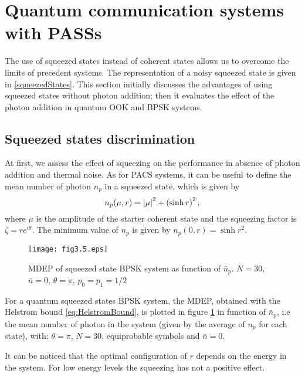 \section{Quantum communication systems with PASSs}
    The use of squeezed states instead of coherent states allows us to overcome the limits
    of precedent systems. The representation of a noisy squeezed state is given in 
    \ref{squeezedStates}. This section initially discusses the advantages of using squeezed states 
    without photon addition; then it evaluates the effect of the photon addition
    in quantum OOK and BPSK systems.

    \subsection{Squeezed states discrimination}
        At first, we assess the effect of squeezing on the performance in absence of photon 
        addition and thermal noise. As for PACS systems, it can be useful to define the mean 
        number of photon $n_p$ in a squeezed state, which is given by
        \begin{equation}
            n_p(\mu,r) = \absolutevalue{\mu}^2 + \left(\sinh{r}\right)^2;
        \end{equation}
        where $\mu$ is the amplitude of the starter coherent state and the squeezing factor
        is $\zeta = r e^{i\theta}$. The minimum value of $n_p$ is given by $n_p(0,r) = \sinh{r}^2$.

        \begin{figure}[tbp]
            \begin{center}
                \texttt{[image: fig3.5.eps]}
                \caption{MDEP of squeezed state BPSK system as function of $\bar{n}_p$. 
                    $N=30$, $\bar{n}=0$, $\theta=\pi$, $p_0=p_1=1/2$}
                \label{fig:3.5}
            \end{center}     
        \end{figure}
        For a quantum squeezed states BPSK system, the MDEP, obtained with the Helstrom bound 
        \ref{eq:HelstromBound}, is plotted in figure \ref{fig:3.5} in function of $\bar{n}_p$,
        i.e the mean number of photon in the system (given by the average of $n_p$ for each state), with:
        $\theta=\pi$, $N=30$, equiprobable symbols and $\bar{n}=0$.

        It can be noticed that the optimal configuration of $r$ depends on the energy in the 
        system. For low energy levels the squeezing has not a positive effect.


